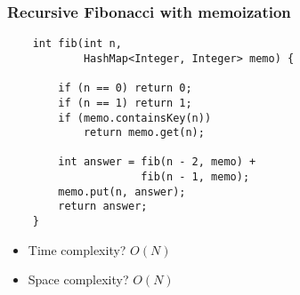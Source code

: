 \documentclass[t]{beamer}
\begin{document}
\begin{frame}[fragile]

    \frametitle{Recursive Fibonacci with memoization}
    
    \begin{verbatim}
    int fib(int n,
            HashMap<Integer, Integer> memo) {

        if (n == 0) return 0;
        if (n == 1) return 1;
        if (memo.containsKey(n))
            return memo.get(n);

        int answer = fib(n - 2, memo) +
                     fib(n - 1, memo);
        memo.put(n, answer);
        return answer;
    }
    \end{verbatim}

    \pause

    \begin{itemize}

        \item

        Time complexity? \pause $O(N)$ \pause

        \item

        Space complexity? \pause $O(N)$

    \end{itemize}

\end{frame}
\end{document}
